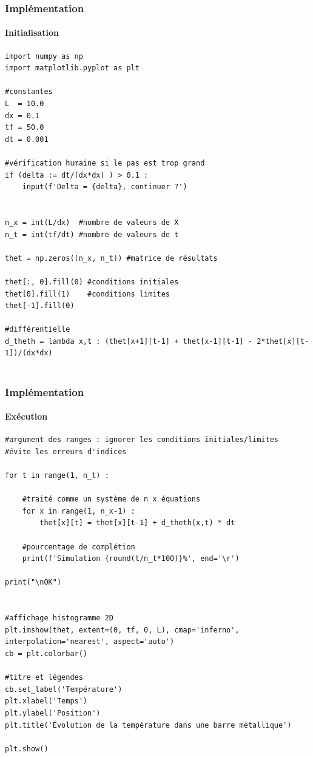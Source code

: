 \documentclass{beamer}
\begin{document}
	\begin{frame}[fragile]
    \frametitle{Implémentation}
    \framesubtitle{Initialisation}

\begin{verbatim}
import numpy as np
import matplotlib.pyplot as plt

#constantes
L  = 10.0
dx = 0.1
tf = 50.0
dt = 0.001

#vérification humaine si le pas est trop grand
if (delta := dt/(dx*dx) ) > 0.1 :
    input(f'Delta = {delta}, continuer ?')


n_x = int(L/dx)  #nombre de valeurs de X
n_t = int(tf/dt) #nombre de valeurs de t

thet = np.zeros((n_x, n_t)) #matrice de résultats

thet[:, 0].fill(0) #conditions initiales
thet[0].fill(1)    #conditions limites
thet[-1].fill(0)

#différentielle
d_theth = lambda x,t : (thet[x+1][t-1] + thet[x-1][t-1] - 2*thet[x][t-1])/(dx*dx)


\end{verbatim}


    \end{frame}



    \begin{frame}[fragile]
    \frametitle{Implémentation}
    \framesubtitle{Exécution}

\begin{verbatim}
#argument des ranges : ignorer les conditions initiales/limites
#évite les erreurs d'indices

for t in range(1, n_t) :

    #traité comme un système de n_x équations
    for x in range(1, n_x-1) :
        thet[x][t] = thet[x][t-1] + d_theth(x,t) * dt

    #pourcentage de complétion
    print(f'Simulation {round(t/n_t*100)}%', end='\r')

print("\nOK")


#affichage histogramme 2D
plt.imshow(thet, extent=(0, tf, 0, L), cmap='inferno', interpolation='nearest', aspect='auto')
cb = plt.colorbar()

#titre et légendes
cb.set_label('Température')
plt.xlabel('Temps')
plt.ylabel('Position')
plt.title('Évolution de la température dans une barre métallique')

plt.show()
\end{verbatim}


    \end{frame}
\end{document}
